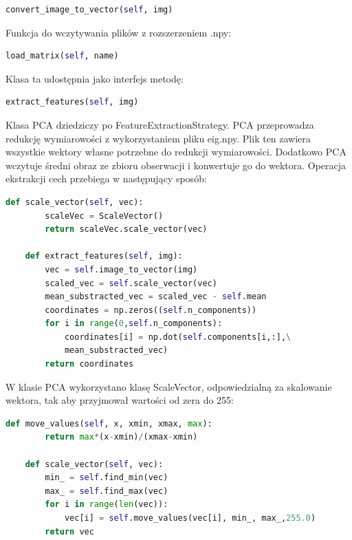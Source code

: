 \documentclass[oneside, eng]{mgr}
\begin{document}
\begin{lstlisting}[language=Python]
	convert_image_to_vector(self, img)
\end{lstlisting}

Funkcja do wczytywania plików z rozszerzeniem .npy: 
	
\begin{lstlisting}[language=Python]
	load_matrix(self, name)
\end{lstlisting}

Klasa ta udostępnia jako interfejs metodę:

\begin{lstlisting}[language=Python]
	extract_features(self, img)
\end{lstlisting}

Klasa PCA dziedziczy po FeatureExtractionStrategy. PCA przeprowadza redukcję wymiarowości z wykorzystaniem pliku eig.npy. Plik ten zawiera wszystkie wektory własne potrzebne do redukcji wymiarowości. Dodatkowo PCA wczytuje średni obraz ze zbioru obserwacji i konwertuje go do wektora. Operacja ekstrakcji cech przebiega w następujący sposób:

\begin{lstlisting}[language=Python]
    def scale_vector(self, vec):
        scaleVec = ScaleVector()
        return scaleVec.scale_vector(vec)

    def extract_features(self, img):
        vec = self.image_to_vector(img)
        scaled_vec = self.scale_vector(vec)
        mean_substracted_vec = scaled_vec - self.mean
        coordinates = np.zeros((self.n_components))
        for i in range(0,self.n_components):
            coordinates[i] = np.dot(self.components[i,:],\
            mean_substracted_vec)
        return coordinates
\end{lstlisting}

W klasie PCA wykorzystano klasę ScaleVector, odpowiedzialną za skalowanie wektora, tak aby przyjmował wartości od zera do 255:

\begin{lstlisting}[language=Python]
    def move_values(self, x, xmin, xmax, max):
        return max*(x-xmin)/(xmax-xmin)

    def scale_vector(self, vec):
        min_ = self.find_min(vec)
        max_ = self.find_max(vec)
        for i in range(len(vec)):
            vec[i] = self.move_values(vec[i], min_, max_,255.0)
        return vec

\end{lstlisting}
\end{document}
